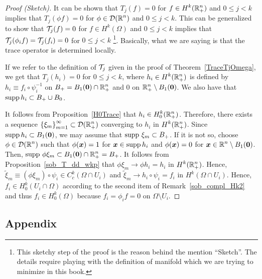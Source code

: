 \begin{proof}[Proof (Sketch)]
It can be shown that $T_j(f) = 0$ for
$\displaystyle f \in H^k(\mathbb{R}_+^n)$ and $0 \leq j <k$
implies that $\displaystyle T_j(\phi f) = 0$ for
$\displaystyle \phi \in \mathcal{D}(\mathbb{R}^n)$ and $0 \leq j <k$.   This can be
generalized to show that $\mathcal{T}_j(f) = 0$ for
$\displaystyle f \in H^k(\Omega)$ and $0 \leq j <k$
implies that $\displaystyle \mathcal{T}_j(\phi_i f) = \mathcal{T}_j(f_i) = 0$ for
$0 \leq j <k$ \footnote{This sketchy step of the proof is the reason behind
the mention ``Sketch''.  The details require playing with the
definition of manifold which we are trying to minimize in this book.}.
Basically, what we are saying is that the trace operator is
determined locally.

If we refer to the definition of $\mathcal{T}_j$ given in the proof of
Theorem~\ref{TraceTjOmega}, we get that
$\displaystyle T_j(h_i) = 0$ for $0 \leq j <k$, where
$\displaystyle h_i \in H^k(\mathbb{R}^n_+)$ is defined by
$h_i \equiv f_i \circ \psi_i^{-1}$ on
$\displaystyle B_+ = B_1({\bm{0}}) \cap \mathbb{R}^n_+$
and $0$ on $\displaystyle \mathbb{R}^n_+ \setminus B_1({\bm{0}})$.  We also have that
$\operatorname{supp} h_i \subset B_+ \cup B_0$.

It follows from Proposition~\ref{H0Trace} that
$\displaystyle h_i \in H^k_0(\mathbb{R}^n_+)$.
Therefore, there exists a sequence
$\displaystyle \left\{\xi_m\right\}_{m=1}^\infty \subset \mathcal{D}(\mathbb{R}^n_+)$
converging to $h_i$ in $\displaystyle H^k(\mathbb{R}^n_+)$.  Since
$\operatorname{supp} h_i \subset B_1({\bm{0}})$, we may assume that
$\operatorname{supp}\, \xi_m \subset B_+$.  If it is not
so, choose $\displaystyle \phi \in \mathcal{D}(\mathbb{R}^n)$ such that
$\phi({\bm{x}}) = 1$ for ${\bm{x}} \in \operatorname{supp} h_i$ and $\phi({\bm{x}}) = 0$ for
$\displaystyle {\bm{x}} \in \mathbb{R}^n \setminus B_1({\bm{0}})$.
Then,
$\displaystyle \operatorname{supp}\, \phi \xi_m \subset B_1({\bm{0}}) \cap \mathbb{R}^n_+ = B_+$.
It follows from Proposition~\ref{sob_T_dd_wkp} that
$\phi \xi_m \to \phi h_i = h_i$ in $\displaystyle H^k(\mathbb{R}^n_+)$.
Hence, $\displaystyle \tilde{\xi}_m \equiv (\phi \xi_m) \circ
\psi_i \in C_c^k(\Omega \cap U_i)$
and $\tilde{\xi}_m \to h_i \circ \psi_i = f_i$
in $\displaystyle H^k(\Omega \cap U_i)$.
Hence, $\displaystyle f_i \in H^k_0(U_i \cap \Omega)$
according to the second item of Remark~\ref{sob_compl_Hk2}
and thus $\displaystyle f_i \in H^k_0(\Omega)$ because $f_i = \phi_i f = 0$ on
$\Omega \setminus U_i$.
\end{proof}

\subsection{Appendix}

